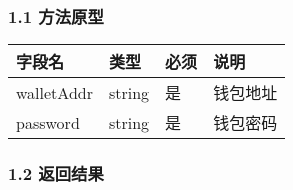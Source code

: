 \documentclass[letterpaper,10pt,english]{sphinxmanual}
\begin{document}
\subsubsection{1.1 方法原型}
\label{\detokenize{BCBWalletSDK_u63a5_u53e3_u8bf4_u660e:id45}}



\begin{savenotes}\sphinxattablestart
\centering
\begin{tabulary}{\linewidth}[t]{|T|T|T|T|}
\hline
\sphinxstyletheadfamily 
字段名
&\sphinxstyletheadfamily 
类型
&\sphinxstyletheadfamily 
必须
&\sphinxstyletheadfamily 
说明
\\
\hline
walletAddr
&
string
&
是
&
钱包地址
\\
\hline
password
&
string
&
是
&
钱包密码
\\
\hline
\end{tabulary}
\par
\sphinxattableend\end{savenotes}


\subsubsection{1.2 返回结果}
\label{\detokenize{BCBWalletSDK_u63a5_u53e3_u8bf4_u660e:id46}}
\end{document}
